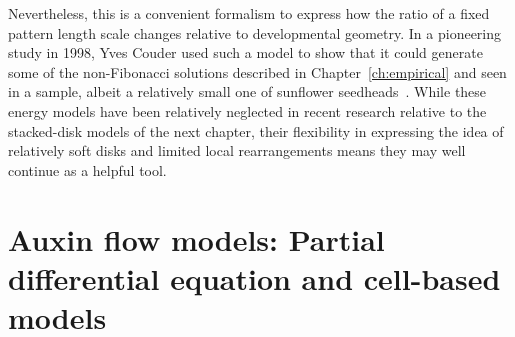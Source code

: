 Nevertheless, this is a convenient formalism to express how the ratio of a  fixed pattern  length scale changes relative to developmental geometry. In a pioneering study in 1998, Yves Couder used such a model to show that it could generate some of the non-Fibonacci solutions described in Chapter~\ref{ch:empirical} and seen in a sample, albeit a relatively small one of sunflower seedheads~\cite{couderInitialTransitionsOrder1998}. 
 While these energy models have been relatively neglected in recent research relative to the stacked-disk models of the next chapter, their flexibility 
 in expressing the idea of relatively soft disks and limited local rearrangements means they may well continue as a helpful tool. 

\section{Auxin flow models: Partial differential equation and cell-based models}

